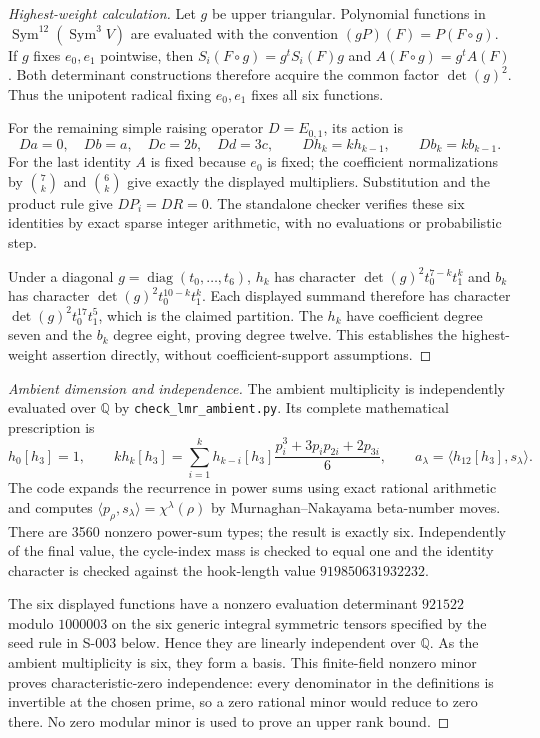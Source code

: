 \begin{proof}[Highest-weight calculation]
Let $g$ be upper triangular. Polynomial functions in
$\operatorname{Sym}^{12}(\operatorname{Sym}^3V)$ are evaluated with the
convention $(gP)(F)=P(F\circ g)$. If $g$ fixes $e_0,e_1$ pointwise,
then $S_i(F\circ g)=g^tS_i(F)g$ and $A(F\circ g)=g^tA(F)$.
Both determinant constructions therefore acquire the common factor
$\det(g)^2$. Thus the unipotent radical fixing $e_0,e_1$ fixes all six
functions.

For the remaining simple raising operator $D=E_{0,1}$, its action is
\[
 Da=0,\quad Db=a,\quad Dc=2b,\quad Dd=3c,
 \qquad Dh_k=kh_{k-1},\qquad Db_k=kb_{k-1}.
\]
For the last identity $A$ is fixed because $e_0$ is fixed; the coefficient
normalizations by $\binom7k$ and $\binom6k$ give exactly the displayed
multipliers. Substitution and the product rule give $DP_i=DR=0$.
The standalone checker verifies these six identities by exact sparse
integer arithmetic, with no evaluations or probabilistic step.

Under a diagonal $g=\operatorname{diag}(t_0,\ldots,t_6)$,
$h_k$ has character $\det(g)^2t_0^{7-k}t_1^k$ and $b_k$ has character
$\det(g)^2t_0^{10-k}t_1^k$. Each displayed summand therefore has character
$\det(g)^2t_0^{17}t_1^5$, which is the claimed partition. The $h_k$ have
coefficient degree seven and the $b_k$ degree eight, proving degree twelve.
This establishes the highest-weight assertion directly, without
coefficient-support assumptions.
\end{proof}

\begin{proof}[Ambient dimension and independence]
The ambient multiplicity is independently evaluated over $\mathbb Q$ by
\texttt{check\_lmr\_ambient.py}. Its complete mathematical prescription is
\[
 h_0[h_3]=1,\qquad
 k h_k[h_3]=\sum_{i=1}^k h_{k-i}[h_3]
          \frac{p_i^3+3p_i p_{2i}+2p_{3i}}6,
 \qquad
 a_\lambda=\langle h_{12}[h_3],s_\lambda\rangle.
\]
The code expands the recurrence in power sums using exact rational
arithmetic and computes $\langle p_\rho,s_\lambda\rangle=\chi^\lambda(\rho)$
by Murnaghan--Nakayama beta-number moves. There are 3560 nonzero
power-sum types; the result is exactly six. Independently of the final
value, the cycle-index mass is checked to equal one and the identity
character is checked against the hook-length value
$919850631932232$.

The six displayed functions have a nonzero evaluation determinant
$921522$ modulo $1000003$ on the six generic integral symmetric tensors
specified by the seed rule in S-003 below. Hence they are linearly
independent over $\mathbb Q$. As the ambient multiplicity is six, they
form a basis. This finite-field nonzero minor proves characteristic-zero
independence: every denominator in the definitions is invertible at the
chosen prime, so a zero rational minor would reduce to zero there.
No zero modular minor is used to prove an upper rank bound.
\end{proof}

